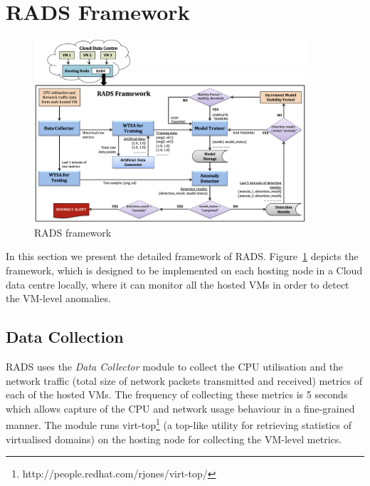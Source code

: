 \section{RADS Framework}
\label{sec:framework} 

\begin{figure}
  \centering
     \includegraphics[width=0.9\textwidth]{figures/RADS_Framework}
   \caption{RADS framework}
  \label{fig:framework}
\end{figure}

\noindent In this section we present the detailed framework of RADS. 
Figure~\ref{fig:framework} depicts the framework, which is designed to be implemented on each hosting node in a Cloud data centre locally, where it can monitor all the hosted VMs in order to detect the VM-level anomalies. %

\subsection{Data Collection}
\noindent RADS uses the \textit{Data Collector} module to collect the CPU utilisation and the network traffic (total size of network packets transmitted and received) metrics of each of the hosted VMs. The frequency of collecting these metrics is 5 seconds which allows capture of the CPU and network usage behaviour in a fine-grained manner.
The module runs virt-top\footnote{http://people.redhat.com/rjones/virt-top/} (a top-like utility for retrieving statistics of virtualised domains) on the hosting node for collecting the VM-level metrics. 


